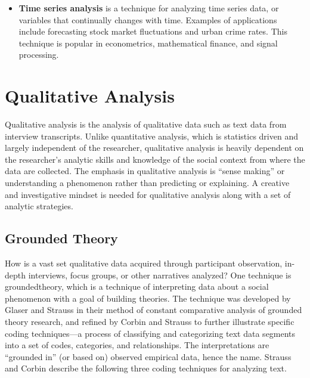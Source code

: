 \begin{itemize}
	\item \textbf{Time series analysis} is a technique for analyzing time series data, or variables that continually changes with time. Examples of applications include forecasting stock market fluctuations and urban crime rates. This technique is popular in econometrics, mathematical finance, and signal processing.
	
\end{itemize}

\section{Qualitative Analysis}

Qualitative analysis is the analysis of qualitative data such as text data from interview transcripts. Unlike quantitative analysis, which is statistics driven and largely independent of the researcher, qualitative analysis is heavily dependent on the researcher's analytic skills and knowledge of the social context from where the data are collected. The emphasis in qualitative analysis is ``sense making'' or understanding a phenomenon rather than predicting or explaining. A creative and investigative mindset is needed for qualitative analysis along with a set of analytic strategies. 

\subsection{Grounded Theory}

How is a vast set qualitative data acquired through participant observation, in-depth interviews, focus groups, or other narratives analyzed? One technique is \gls{groundedtheory}, which is a technique of interpreting data about a social phenomenon with a goal of building theories. The technique was developed by Glaser and Strauss\cite{glaser1967discovery} in their method of constant comparative analysis of grounded theory research, and refined by Corbin and Strauss\cite{corbin1990grounded} to further illustrate specific coding techniques---a process of classifying and categorizing text data segments into a set of codes, categories, and relationships. The interpretations are ``grounded in'' (or based on) observed empirical data, hence the name. Strauss and Corbin\cite{strauss1998basics} describe the following three coding techniques for analyzing text. 

